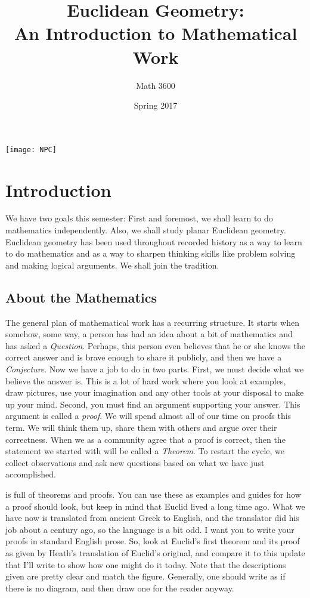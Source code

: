 \documentclass{tufte-handout}
\title{Euclidean Geometry:\\An Introduction to Mathematical Work}
\author[Math 3600]{Math 3600}
\date{Spring 2017}
\theoremstyle{definition}
\begin{document}
\maketitle

\begin{marginfigure}
    \texttt{[image: NPC]}
\end{marginfigure}


\section*{Introduction}

We have two goals this semester:
First and foremost, we shall learn to do mathematics independently.
Also, we shall study planar Euclidean geometry.
Euclidean geometry has been used throughout recorded history as a way to learn to do mathematics and as a way to sharpen thinking skills like problem solving and making logical arguments.
We shall join the tradition.

\subsection*{About the Mathematics}
The general plan of mathematical work has a recurring structure.
It starts when somehow, some way, a person has had an idea about a bit of mathematics and has asked a \emph{Question}.
Perhaps, this person even believes that he or she knows the correct answer and is brave enough to share it publicly, and then we have a \emph{Conjecture}.
Now we have a job to do in two parts.
First, we must decide what we believe the answer is.
This is a lot of hard work where you look at examples, draw pictures, use your imagination and any other tools at your disposal to make up your mind.
Second, you must find an argument supporting your answer.
This argument is called a \emph{proof}.
We will spend almost all of our time on proofs this term. We will think them up, share them with others and argue over their correctness.
When we as a community agree that a proof is correct, then the statement we started with will be called a \emph{Theorem}.
To restart the cycle, we collect observations and ask new questions based on what we have just accomplished.

 is full of theorems and proofs.
 You can use these as examples and guides for how a proof should look, but keep in mind that Euclid lived a long time ago.
 What we have now is translated from ancient Greek to English, and the translator did his job about a century ago, so the language is a bit odd.
I want you to write your proofs in standard English prose.
So, look at Euclid's first theorem and its proof as given by Heath's translation of Euclid's original, and compare it to this update that I'll write to show how one might do it today.
Note that the descriptions given are pretty clear and match the figure.
Generally, one should write as if there is no diagram, and then draw one for the reader anyway.
\end{document}
